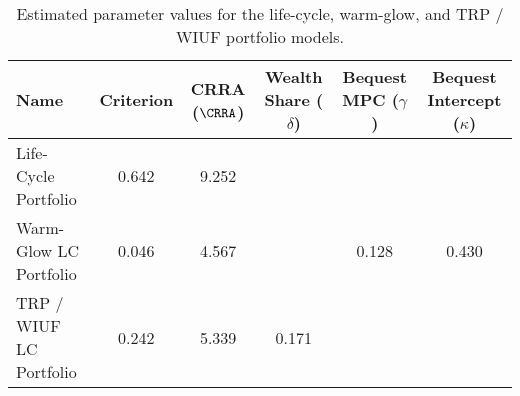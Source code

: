 \begin{table}\centering
    \begin{tabular}{lccccc}
        \toprule
        Name                   & Criterion & CRRA ($\CRRA $) & Wealth Share ($\delta $) & Bequest MPC ($ \gamma $) & Bequest Intercept ($ \kappa $) \\
        \midrule
        Life-Cycle Portfolio   & 0.642     & 9.252          &                         &                           &                                 \\
        Warm-Glow LC Portfolio & 0.046     & 4.567          &                         & 0.128                     & 0.430                          \\
        TRP / WIUF LC Portfolio       & 0.242     & 5.339          & 0.171                   &                           &                                 \\
        \bottomrule
    \end{tabular}
    \caption{Estimated parameter values for the life-cycle, warm-glow, and TRP / WIUF portfolio models.}
    \label{parameters}
\end{table}